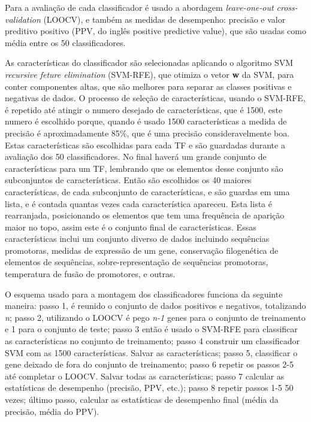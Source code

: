 Para a avaliação de cada classificador é usado a abordagem  \textit{leave-one-out cross-validation} (LOOCV), e também as medidas de desempenho: precisão e valor preditivo positivo (PPV, do inglês positive predictive value), que são usadas como média entre os 50 classificadores.

As características do classificador são selecionadas aplicando o algoritmo SVM \textit{recursive feture elimination} (SVM-RFE), que otimiza o vetor \textbf{w} da SVM, para conter componentes altas, que são melhores para separar as classes positivas e negativas de dados. O processo de seleção de características, usando o SVM-RFE, é repetido até atingir o numero desejado de características, que é 1500, este numero é escolhido porque, quando é usado 1500 características a medida de precisão é aproximadamente 85\%, que é uma precisão consideravelmente boa. Estas características são escolhidas para cada TF e são guardadas durante a avaliação dos 50 classificadores. No final haverá um grande conjunto de características para um TF, lembrando que os elementos desse conjunto são subconjuntos de características. Então são escolhidos os 40 maiores características, de cada subconjunto de características, e são guardas em uma lista, e é contada quantas vezes cada característica apareceu. Esta lista é rearranjada, posicionando os elementos que tem uma frequência de aparição maior no topo, assim este é o conjunto final de características. Essas características inclui um conjunto diverso de dados incluindo sequências promotoras, medidas de expressão de um gene, conservação filogenética de elementos de sequências, sobre-representação de sequências promotoras, temperatura de fusão de promotores, e outras.

O esquema usado para a montagem dos classificadores funciona da seguinte maneira: passo 1, é reunido o conjunto de dados positivos e negativos, totalizando \textit{n}; passo 2, utilizando o LOOCV é pego \textit{n-1} genes para o conjunto de treinamento e 1 para o conjunto de teste; passo 3 então é usado o SVM-RFE para classificar as características no conjunto de treinamento; passo 4 construir um classificador SVM com as 1500 características. Salvar as características; passo 5, classificar o gene deixado de fora do conjunto de treinamento; passo 6 repetir os passos 2-5 até completar o LOOCV. Salvar todas as características; passo 7 calcular as estatísticas de desempenho (precisão, PPV, etc.); passo 8 repetir passos 1-5 50 vezes; último passo, calcular as estatísticas de desempenho final (média da precisão, média do PPV).


